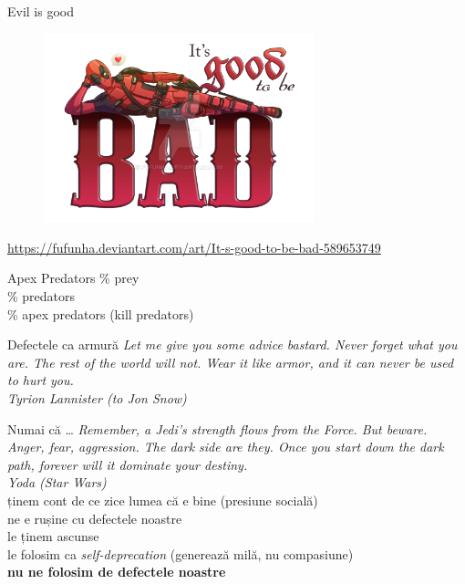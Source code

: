 \documentclass{simple}
\begin{document}
\begin{frame}{Evil is good}
  \centering
  \begin{figure}
    \includegraphics[width=0.7\textwidth]{img/good-to-be-bad.png}
  \end{figure}
  \tiny \url{https://fufunha.deviantart.com/art/It-s-good-to-be-bad-589653749}
\end{frame}

\begin{frame}{Apex Predators}
  \centering
  \Large
  \% prey \\
  \% predators \\
  \% apex predators (kill predators)
\end{frame}

\begin{frame}{Defectele ca armură}
  \centering
  \pause \textit{Let me give you some advice bastard. Never forget what you are. The rest of the world will not. Wear it like armor, and it can never be used to hurt you.}\\
  \vspace{3mm}
  \hfill \textit{Tyrion Lannister (to Jon Snow)}
\end{frame}

\begin{frame}{Numai că \ldots}
  \centering
  \large
  \pause \textit{Remember, a Jedi's strength flows from the Force. But beware. Anger, fear, aggression. The dark side are they. Once you start down the dark path, forever will it dominate your destiny.} \\
  \vspace{3mm}
  \hfill \textit{Yoda (Star Wars)} \\
  \vspace{1cm}
  \pause ținem cont de ce zice lumea că e bine (presiune socială) \\
  \pause ne e rușine cu defectele noastre \\
  \pause le ținem ascunse \\
  \pause le folosim ca \textit{self-deprecation} (generează milă, nu compasiune) \\
  \pause \textbf{nu ne folosim de defectele noastre}
\end{frame}
\end{document}
